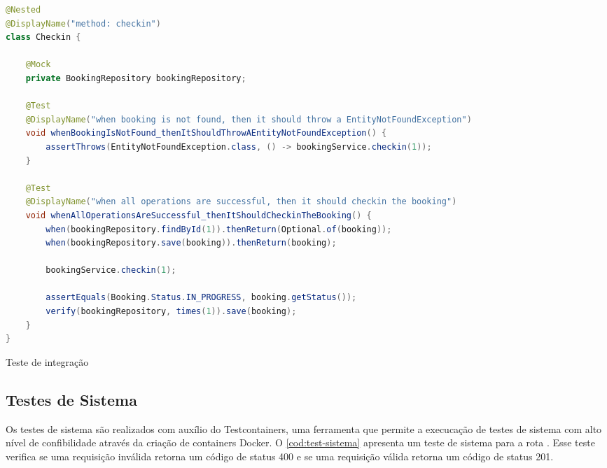 \begin{codigo}[H]
    \begin{lstlisting}[language=Java]
@Nested
@DisplayName("method: checkin")
class Checkin {

    @Mock
    private BookingRepository bookingRepository;

    @Test
    @DisplayName("when booking is not found, then it should throw a EntityNotFoundException")
    void whenBookingIsNotFound_thenItShouldThrowAEntityNotFoundException() {
        assertThrows(EntityNotFoundException.class, () -> bookingService.checkin(1));
    }

    @Test
    @DisplayName("when all operations are successful, then it should checkin the booking")
    void whenAllOperationsAreSuccessful_thenItShouldCheckinTheBooking() {
        when(bookingRepository.findById(1)).thenReturn(Optional.of(booking));
        when(bookingRepository.save(booking)).thenReturn(booking);

        bookingService.checkin(1);

        assertEquals(Booking.Status.IN_PROGRESS, booking.getStatus());
        verify(bookingRepository, times(1)).save(booking);
    }
}
    \end{lstlisting}
    \caption{Teste de integração}
    \label{cod:test-integracao}
\end{codigo}

\subsection{Testes de Sistema}
Os testes de sistema são realizados com auxílio do Testcontainers, uma ferramenta que permite a execucação de testes de sistema com alto nível de confibilidade através da criação de containers Docker. O \autoref{cod:test-sistema} apresenta um teste de sistema para a rota . Esse teste verifica se uma requisição inválida retorna um código de status 400 e se uma requisição válida retorna um código de status 201.

